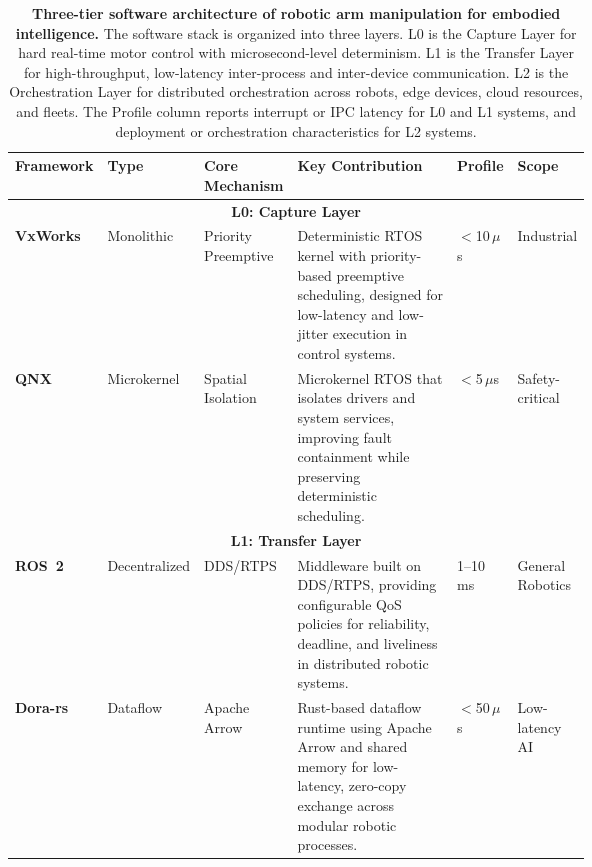 \documentclass[acmsmall,screen,review]{acmart}
\begin{document}
\begin{table}[!t]
\centering
\caption{\textbf{Three-tier software architecture of robotic arm manipulation for embodied intelligence.}
The software stack is organized into three layers. L0 is the Capture Layer for hard real-time motor control with microsecond-level determinism. L1 is the Transfer Layer for high-throughput, low-latency inter-process and inter-device communication. L2 is the Orchestration Layer for distributed orchestration across robots, edge devices, cloud resources, and fleets. The Profile column reports interrupt or IPC latency for L0 and L1 systems, and deployment or orchestration characteristics for L2 systems.}\label{tab:framework_comparison}
\renewcommand{\arraystretch}{1.2}
\setlength{\tabcolsep}{3pt}
\scriptsize

\begin{tabular}{
  l
  l
  p{0.15\linewidth}
  p{0.34\linewidth}
  p{0.06\linewidth}
  p{0.12\linewidth}
}
\toprule
\textbf{Framework} &
\textbf{Type} &
\textbf{Core Mechanism} &
\textbf{Key Contribution} &
\textbf{Profile} &
\textbf{Scope} \\
\midrule

\multicolumn{6}{c}{\textbf{L0: Capture Layer}} \\
\midrule

\textbf{VxWorks}~\cite{xu2014mpi} &
Monolithic&
Priority Preemptive &
Deterministic RTOS kernel with priority-based preemptive scheduling, designed for low-latency and low-jitter execution in control systems. &
$<$10\,$\mu$s &
Industrial \\

\textbf{QNX}~\cite{dan1992architectural} &
Microkernel &
Spatial Isolation &
Microkernel RTOS that isolates drivers and system services, improving fault containment while preserving deterministic scheduling. &
$<$5\,$\mu$s &
Safety-critical \\

\midrule
\multicolumn{6}{c}{\textbf{L1: Transfer Layer}} \\
\midrule

\textbf{ROS~2}~\cite{macenski2022robot} &
Decentralized &
DDS/RTPS &
Middleware built on DDS/RTPS, providing configurable QoS policies for reliability, deadline, and liveliness in distributed robotic systems. &
1--10\,ms &
General Robotics \\

\textbf{Dora-rs}~\cite{zhang2026dora} &
Dataflow &
Apache Arrow &
Rust-based dataflow runtime using Apache Arrow and shared memory for low-latency, zero-copy exchange across modular robotic processes. &
$<$50\,$\mu$s &
Low-latency AI \\


\end{tabular}
\end{table}
\end{document}
